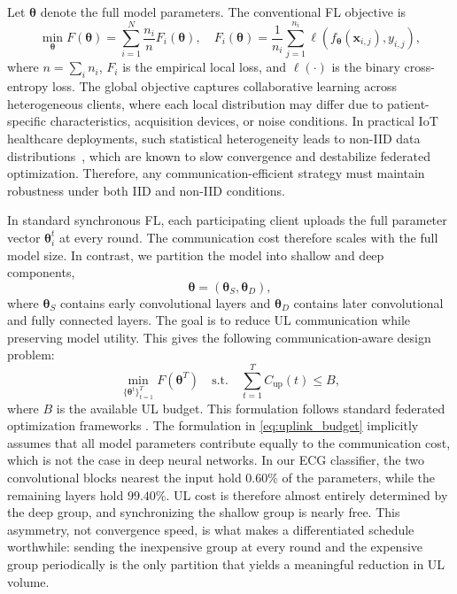 \documentclass[10pt,conference]{IEEEtran}
\begin{document}
Let $\boldsymbol{\theta}$ denote the full model parameters. The conventional FL objective is
\begin{equation}
\min_{\boldsymbol{\theta}} F(\boldsymbol{\theta})
=
\sum_{i=1}^{N}\frac{n_i}{n}F_i(\boldsymbol{\theta}),
\quad
F_i(\boldsymbol{\theta})
=
\frac{1}{n_i}\sum_{j=1}^{n_i}
\ell(f_{\boldsymbol{\theta}}(\mathbf{x}_{i,j}),y_{i,j}),
\end{equation}
where $n=\sum_i n_i$, $F_i$ is the empirical local loss, and $\ell(\cdot)$ is the binary cross-entropy loss. The global objective captures collaborative learning across heterogeneous clients, where each local distribution may differ due to patient-specific characteristics, acquisition devices, or noise conditions. In practical IoT healthcare deployments, such statistical heterogeneity leads to non-IID data distributions~\cite{li2020federated,wang2020tackling}, which are known to slow convergence and destabilize federated optimization. Therefore, any communication-efficient strategy must maintain robustness under both IID and non-IID conditions.

In standard synchronous FL, each participating client uploads the full parameter vector $\boldsymbol{\theta}_i^t$ at every round. The communication cost therefore scales with the full model size. In contrast, we partition the model into shallow and deep components,
\begin{equation}
\boldsymbol{\theta}=(\boldsymbol{\theta}_S,\boldsymbol{\theta}_D),
\end{equation}
where $\boldsymbol{\theta}_S$ contains early convolutional layers and $\boldsymbol{\theta}_D$ contains later convolutional and fully connected layers. The goal is to reduce UL communication while preserving model utility. This gives the following communication-aware design problem:
\begin{equation}
\label{eq:uplink_budget}
\min_{\{\boldsymbol{\theta}^t\}_{t=1}^{T}}
F(\boldsymbol{\theta}^T)
\quad
\text{s.t.}
\quad
\sum_{t=1}^{T}C_{\text{up}}(t)\leq B,
\end{equation}
where $B$ is the available UL budget. This formulation follows standard federated optimization frameworks \cite{mcmahan2017,li2020federated}.  \noindent
The formulation in \eqref{eq:uplink_budget} implicitly assumes that all model parameters contribute equally to the communication cost, which is not the case in deep neural networks. In our ECG classifier, the two convolutional blocks nearest the input hold $0.60\%$ of the parameters, while the remaining layers hold $99.40\%$. UL cost is therefore almost entirely determined by the deep group, and synchronizing the shallow group is nearly free. This asymmetry, not convergence speed, is what makes a differentiated schedule worthwhile: sending the inexpensive group at every round and the expensive group periodically is the only partition that yields a meaningful reduction in UL volume.
\end{document}
